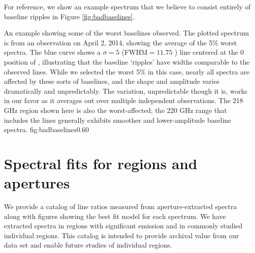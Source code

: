 For reference, we show an example spectrum that we believe to consist entirely
of baseline ripples in Figure \ref{fig:badbaselines}.

{An example showing some of the worst baselines observed.  The plotted spectrum
is from an observation on April 2, 2014, showing the average of the 5\% worst
spectra.  The blue curve shows a $\sigma=5$ \kms (FWHM$=11.75$ \kms) line centered
at the 0 \kms position of \para \threeohthree,
illustrating that the baseline `ripples' have widths comparable to the observed
lines.  While we selected the worst 5\% in this case, nearly all spectra are
affected by these sorts of baselines, and the shape and amplitude varies
dramatically and unpredictably.  The variation, unpredictable though it is,
works in our favor as it averages out over multiple independent observations.
The 218 GHz region shown here is also the worst-affected; the 220 GHz range
that includes the \thirteenco lines generally exhibits smoother and
lower-amplitude baseline spectra.}
{fig:badbaselines}{0.6}{0}



\section{Spectral fits for regions and apertures}
We provide a catalog of line ratios measured from aperture-extracted spectra
along with figures showing the best fit model for each spectrum.  We have
extracted spectra in regions with significant \para emission and in commonly
studied individual regions.  This catalog is intended to provide archival value
from our data set and enable future studies of individual regions.

